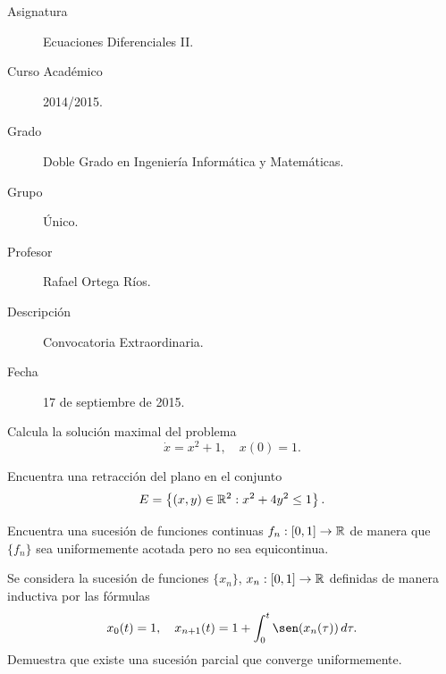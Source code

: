 \documentclass[12pt]{article}
\begin{document}

    
    

    \begin{description}
        \item[Asignatura] Ecuaciones Diferenciales II.
        \item[Curso Académico] 2014/2015.
        \item[Grado] Doble Grado en Ingeniería Informática y Matemáticas.
        \item[Grupo] Único.
        \item[Profesor] Rafael Ortega Ríos.
        \item[Descripción] Convocatoria Extraordinaria.
        \item[Fecha] 17 de septiembre de 2015.
    
    \end{description}
    \newpage


    
    \begin{ejercicio}
        Calcula la solución maximal del problema
        \[ \dot{x} = x^2 + 1, \quad x(0) = 1. \]
    \end{ejercicio}

    \begin{ejercicio}
        Encuentra una retracción del plano en el conjunto
        \[ E = \left\{ (x,y) \in \mathbb{R}^2 : x^2 + 4y^2 \leq 1 \right\}. \]
    \end{ejercicio}

    \begin{ejercicio}
        Encuentra una sucesión de funciones continuas $f_n : \left[0, 1\right] \to \mathbb{R}$ de manera que $\{f_n\}$ sea uniformemente acotada pero no sea equicontinua.
    \end{ejercicio}

    \begin{ejercicio}
        Se considera la sucesión de funciones $\{x_n\}$, $x_n : \left[0, 1\right] \to \mathbb{R}$ definidas de manera inductiva por las fórmulas
        \[ x_0(t) = 1, \quad x_{n+1}(t) = 1 + \int_0^t \sen(x_n(\tau)) \, d\tau. \]
        Demuestra que existe una sucesión parcial que converge uniformemente.
    \end{ejercicio}
\end{document}
